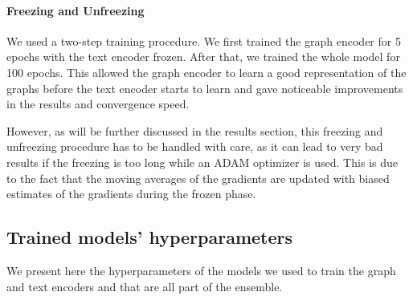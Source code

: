 \documentclass[switch, 12pt]{article}
\begin{document}
\begin{multicols}{2}
    \paragraph*{Freezing and Unfreezing}
    We used a two-step training procedure. We first trained the graph encoder for 5 epochs with the text encoder frozen. After that, we trained the whole model for 100 epochs. This allowed the graph encoder to learn a good representation of the graphs before the text encoder starts to learn and gave noticeable improvements in the results and convergence speed.

    However, as will be further discussed in the results section, this freezing and unfreezing procedure has to be handled with care, as it can lead to very bad results if the freezing is too long while an ADAM optimizer is used. This is due to the fact that the moving averages of the gradients are updated with biased estimates of the gradients during the frozen phase.

    \subsection{Trained models' hyperparameters}
    We present here the hyperparameters of the models we used to train the graph and text encoders and that are all part of the ensemble.

\end{multicols}
\end{document}
